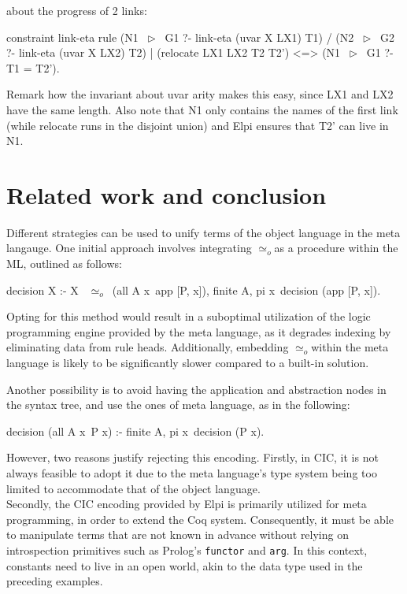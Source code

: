 \documentclass[sigconf,natbib=false,review]{acmart}
\newcommand{\UnifRel}{\ensuremath{\simeq}}
\newcommand{\Uo}{\texorpdfstring{\ensuremath{\UnifRel_o}\xspace}{unif\_o}}
\begin{document}
about the progress of 2 links:

\begin{elpicode}
constraint link-eta {
  rule (N1 ~$\triangleright$~ G1 ?- link-eta (uvar X LX1) T1) %
    /  (N2 ~$\triangleright$~ G2 ?- link-eta (uvar X LX2) T2) %
    |  (relocate LX1 LX2 T2 T2')             %
   <=> (N1 ~$\triangleright$~ G1 ?- T1 = T2').                %
}
\end{elpicode}

Remark how the invariant about uvar arity makes this easy, since LX1 and LX2
have the same length. Also note that N1 only contains the names of the first
link (while relocate runs in the disjoint union) and Elpi ensures that
T2' can live in N1.

\noindent
\section{Related work and conclusion}

Different strategies can be used to unify terms of the object language in the
meta langauge. One initial approach involves integrating \Uo as a procedure
within the ML, outlined as follows:

\begin{elpicode}
  decision X :- X ~\Uo~(all A x\ app [P, x]), finite A,
    pi x\ decision (app [P, x]).
\end{elpicode}

Opting for this method would result in a suboptimal utilization of the logic
programming engine provided by the meta language, as it degrades indexing by
eliminating data from rule heads. Additionally, embedding \Uo within the meta
language is likely to be significantly slower compared to a built-in
solution.

Another possibility is to avoid having the application and abstraction nodes
in the syntax tree, and use the ones of meta language, as in the following:

\begin{elpicode}
decision (all A x\ P x) :- finite A, pi x\ decision (P x).
\end{elpicode}

\noindent
However, two reasons justify rejecting this encoding. Firstly, in CIC, it is
not always feasible to adopt it due to the meta language's type system being
too limited to accommodate that of the object language. \\
Secondly, the CIC encoding provided by Elpi is primarily utilized for meta
programming, in order to extend the Coq system. Consequently, it must be able to
manipulate terms that are not known in advance
without relying on introspection primitives such as Prolog's
\texttt{functor} and \texttt{arg}. In this context, constants need to live in
an open world, akin to the  data type used in the preceding
examples.
\end{document}
